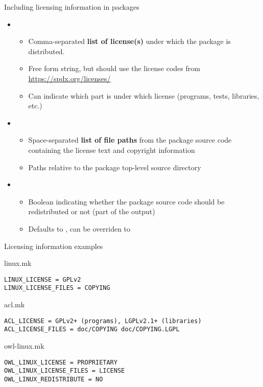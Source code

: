 \begin{frame}{Including licensing information in packages}
  \begin{itemize}
  \item {}
    \begin{itemize}
    \item Comma-separated {\bf list of license(s)} under which the
      package is distributed.
    \item Free form string, but should use the license codes from
      \url{https://spdx.org/licenses/}
    \item Can indicate which part is under which license (programs,
      tests, libraries, etc.)
    \end{itemize}
  \item {}
    \begin{itemize}
    \item Space-separated {\bf list of file paths} from the package
      source code containing the license text and copyright
      information
    \item Paths relative to the package top-level source directory
    \end{itemize}
  \item {}
    \begin{itemize}
    \item Boolean indicating whether the package source code should be
      redistributed or not (part of the  output)
    \item Defaults to , can be overriden to 
    \end{itemize}
  \end{itemize}
\end{frame}

\begin{frame}[fragile]{Licensing information examples}
  \begin{block}{linux.mk}
\begin{verbatim}
LINUX_LICENSE = GPLv2
LINUX_LICENSE_FILES = COPYING
\end{verbatim}
  \end{block}

\begin{block}{acl.mk}
\begin{verbatim}
ACL_LICENSE = GPLv2+ (programs), LGPLv2.1+ (libraries)
ACL_LICENSE_FILES = doc/COPYING doc/COPYING.LGPL
\end{verbatim}
\end{block}

\begin{block}{owl-linux.mk}
\begin{verbatim}
OWL_LINUX_LICENSE = PROPRIETARY
OWL_LINUX_LICENSE_FILES = LICENSE
OWL_LINUX_REDISTRIBUTE = NO
\end{verbatim}
\end{block}

\end{frame}

